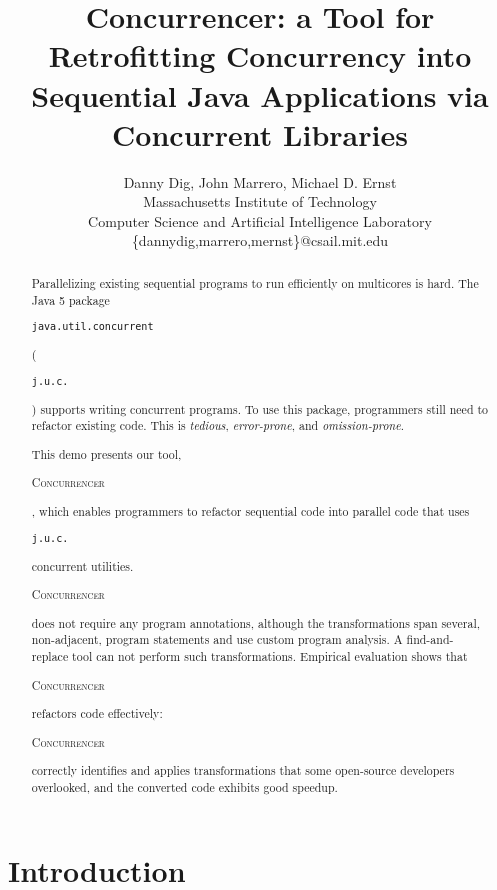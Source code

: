 \documentclass[times,10pt,twocolumn]{article}
\newcommand{\tool}{\begin{scriptsize}\textsc{Concurrencer}\end{scriptsize}\xspace}
\newcommand{\code}[1]{\begin{small}\texttt{#1}\end{small}}
\begin{document}
\title{Concurrencer: a Tool for Retrofitting Concurrency into Sequential Java
Applications via Concurrent Libraries}


\author{Danny Dig, John Marrero, Michael D. Ernst\\
Massachusetts Institute of Technology\\ Computer Science and Artificial
Intelligence Laboratory \\ \{dannydig,marrero,mernst\}@csail.mit.edu\\
}

\maketitle
\thispagestyle{empty}

\begin{abstract}
Parallelizing existing sequential programs to run efficiently on multicores is
hard.  The Java 5 package \code{java.util.concurrent} (\code{j.u.c.}) supports
writing concurrent programs. To use this package, programmers still need to
refactor existing code. This is \emph{tedious}, \emph{error-prone}, and
\emph{omission-prone}.

This demo presents our tool, \tool, which enables programmers to refactor
sequential code into parallel code that uses \code{j.u.c.} concurrent
utilities. \tool does not require any program annotations, although the
transformations span several, non-adjacent, program statements
and use custom program analysis. A find-and-replace tool can not perform
such transformations. Empirical evaluation shows that \tool refactors code
effectively: \tool correctly identifies and applies transformations that some
open-source developers overlooked, and the converted code exhibits good speedup.

\end{abstract}



\section{Introduction}

\end{document}
